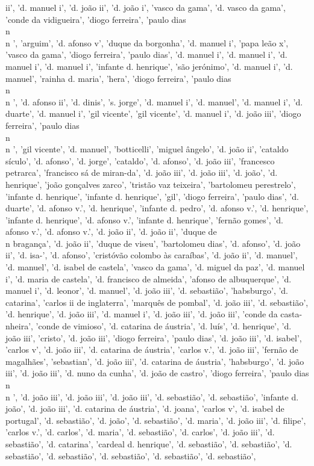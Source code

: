 \documentclass{article}
\begin{document}
\begin{itemize}
ii', 'd. manuel i', 'd. joão ii', 'd. joão i', 'vasco da gama', 'd. vasco da gama', 'conde da vidigueira', 'diogo ferreira', 'paulo dias\\n\\n ', 'arguim', 'd. afonso v', 'duque da borgonha', 'd. manuel i', 'papa leão x', 'vasco da gama', 'diogo ferreira', 'paulo dias', 'd. manuel i', 'd. manuel i', 'd. manuel i', 'd. manuel i', 'infante d. henrique', 'são jerónimo', 'd. manuel i', 'd. manuel', 'rainha d. maria', 'hera', 'diogo ferreira', 'paulo dias\\n\\n ', 'd. afonso ii', 'd. dinis', 's. jorge', 'd. manuel i', 'd. manuel', 'd. manuel i', 'd. duarte', 'd. manuel i', 'gil vicente', 'gil vicente', 'd. manuel i', 'd. joão iii', 'diogo ferreira', 'paulo dias\\n\\n ', 'gil vicente', 'd. manuel', 'botticelli', 'miguel ângelo', 'd. joão ii', 'cataldo sículo', 'd. afonso', 'd. jorge', 'cataldo', 'd. afonso', 'd. joão iii', 'francesco petrarca', 'francisco sá de miran-da', 'd. joão iii', 'd. joão iii', 'd. joão', 'd. henrique', 'joão gonçalves zarco', 'tristão vaz teixeira', 'bartolomeu perestrelo', 'infante d. henrique', 'infante d. henrique', 'gil', 'diogo ferreira', 'paulo dias', 'd. duarte', 'd. afonso v.', 'd. henrique', 'infante d. pedro', 'd. afonso v.', 'd. henrique', 'infante d. henrique', 'd. afonso v.', 'infante d. henrique', 'fernão gomes', 'd. afonso v.', 'd. afonso v.', 'd. joão ii', 'd. joão ii', 'duque de\\n bragança', 'd. joão ii', 'duque de viseu', 'bartolomeu dias', 'd. afonso', 'd. joão ii', 'd. isa-', 'd. afonso', 'cristóvão colombo às caraíbas', 'd. joão ii', 'd. manuel', 'd. manuel', 'd. isabel de castela', 'vasco da gama', 'd. miguel da paz', 'd. manuel i', 'd. maria de castela', 'd. francisco de almeida', 'afonso de albuquerque', 'd. manuel i', 'd. leonor', 'd. manuel', 'd. joão iii', 'd. sebastião', 'habsburgo', 'd. catarina', 'carlos ii de inglaterra', 'marquês de pombal', 'd. joão iii', 'd. sebastião', 'd. henrique', 'd. joão iii', 'd. manuel i', 'd. joão iii', 'd. joão iii', 'conde da casta-nheira', 'conde de vimioso', 'd. catarina de áustria', 'd. luís', 'd. henrique', 'd. joão iii', 'cristo', 'd. joão iii', 'diogo ferreira', 'paulo dias', 'd. joão iii', 'd. isabel', 'carlos v', 'd. joão iii', 'd. catarina de áustria', 'carlos v.', 'd. joão iii', 'fernão de magalhães', 'sebastian', 'd. joão iii', 'd. catarina de áustria', 'habsburgo', 'd. joão iii', 'd. joão iii', 'd. nuno da cunha', 'd. joão de castro', 'diogo ferreira', 'paulo dias\\n\\n ', 'd. joão iii', 'd. joão iii', 'd. joão iii', 'd. sebastião', 'd. sebastião', 'infante d. joão', 'd. joão iii', 'd. catarina de áustria', 'd. joana', 'carlos v', 'd. isabel de portugal', 'd. sebastião', 'd. joão', 'd. sebastião', 'd. maria', 'd. joão iii', 'd. filipe', 'carlos v.', 'd. carlos', 'd. maria', 'd. sebastião', 'd. carlos', 'd. joão iii', 'd. sebastião', 'd. catarina', 'cardeal d. henrique', 'd. sebastião', 'd. sebastião', 'd. sebastião', 'd. sebastião', 'd. sebastião', 'd. sebastião', 'd. sebastião', 
\end{itemize}
\end{document}
